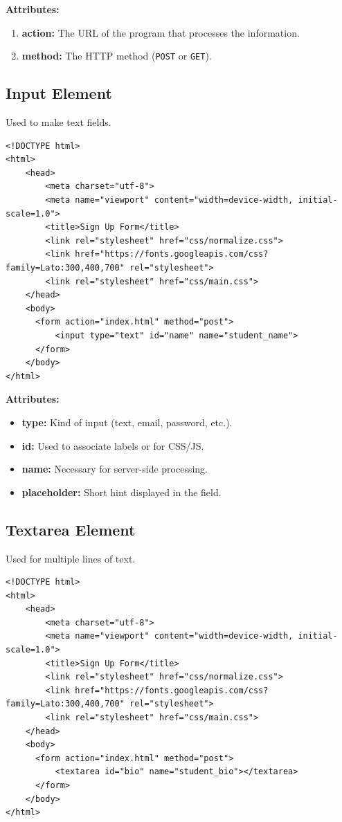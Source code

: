 \documentclass[12pt,a4paper]{article}
\begin{document}
\textbf{Attributes:}
\begin{enumerate}
    \item \textbf{action:} The URL of the program that processes the information.
    \item \textbf{method:} The HTTP method (\texttt{POST} or \texttt{GET}).
\end{enumerate}

\subsection*{Input Element}
Used to make text fields.
\begin{verbatim}
<!DOCTYPE html>
<html>
    <head>
        <meta charset="utf-8">
        <meta name="viewport" content="width=device-width, initial-scale=1.0">
        <title>Sign Up Form</title>
        <link rel="stylesheet" href="css/normalize.css">
        <link href="https://fonts.googleapis.com/css?family=Lato:300,400,700" rel="stylesheet">
        <link rel="stylesheet" href="css/main.css">
    </head>
    <body>
      <form action="index.html" method="post">
          <input type="text" id="name" name="student_name">
      </form>
    </body>
</html>
\end{verbatim}

\textbf{Attributes:}
\begin{itemize}
    \item \textbf{type:} Kind of input (text, email, password, etc.).
    \item \textbf{id:} Used to associate labels or for CSS/JS.
    \item \textbf{name:} Necessary for server-side processing.
    \item \textbf{placeholder:} Short hint displayed in the field.
\end{itemize}

\subsection*{Textarea Element}
Used for multiple lines of text.
\begin{verbatim}
<!DOCTYPE html>
<html>
    <head>
        <meta charset="utf-8">
        <meta name="viewport" content="width=device-width, initial-scale=1.0">
        <title>Sign Up Form</title>
        <link rel="stylesheet" href="css/normalize.css">
        <link href="https://fonts.googleapis.com/css?family=Lato:300,400,700" rel="stylesheet">
        <link rel="stylesheet" href="css/main.css">
    </head>
    <body>
      <form action="index.html" method="post">
          <textarea id="bio" name="student_bio"></textarea>
      </form>
    </body>
</html>
\end{verbatim}
\end{document}
